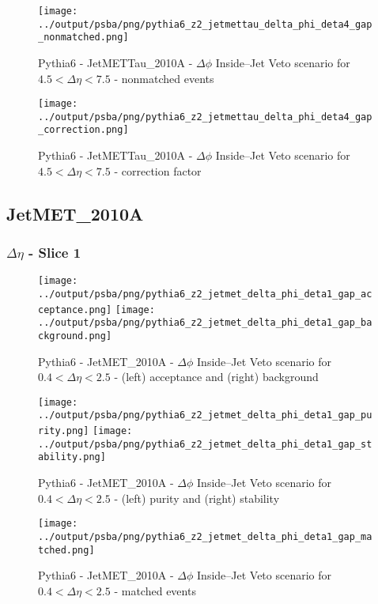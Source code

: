 \documentclass[11pt]{book}
\begin{document}
\begin{figure}[ht]
\centering
\texttt{[image: ../output/psba/png/pythia6\_z2\_jetmettau\_delta\_phi\_deta4\_gap\_nonmatched.png]}
\caption{Pythia6 - JetMETTau\_2010A - $\Delta\phi$ Inside--Jet Veto scenario for $4.5 < \Delta\eta < 7.5$ - nonmatched events}
\label{fig:p6_jetmettau_delta_phi_deta4_gap_nonmatched}
\end{figure}

\begin{figure}[ht]
\centering
\texttt{[image: ../output/psba/png/pythia6\_z2\_jetmettau\_delta\_phi\_deta4\_gap\_correction.png]}
\caption{Pythia6 - JetMETTau\_2010A - $\Delta\phi$ Inside--Jet Veto scenario for $4.5 < \Delta\eta < 7.5$ - correction factor}
\label{fig:p6_jetmettau_delta_phi_deta4_gap_correction}
\end{figure}

\clearpage
\subsection{JetMET\_2010A}
\subsubsection{$\Delta\eta$ - Slice 1}
\begin{figure}[ht]
\centering
\texttt{[image: ../output/psba/png/pythia6\_z2\_jetmet\_delta\_phi\_deta1\_gap\_acceptance.png]}
\texttt{[image: ../output/psba/png/pythia6\_z2\_jetmet\_delta\_phi\_deta1\_gap\_background.png]}
\caption{Pythia6 - JetMET\_2010A - $\Delta\phi$ Inside--Jet Veto scenario for $0.4 < \Delta\eta < 2.5$ - (left) acceptance and (right) background}
\label{fig:p6_jetmet_delta_phi_deta1_gap_ab}
\end{figure}

\begin{figure}[ht]
\centering
\texttt{[image: ../output/psba/png/pythia6\_z2\_jetmet\_delta\_phi\_deta1\_gap\_purity.png]}
\texttt{[image: ../output/psba/png/pythia6\_z2\_jetmet\_delta\_phi\_deta1\_gap\_stability.png]}
\caption{Pythia6 - JetMET\_2010A - $\Delta\phi$ Inside--Jet Veto scenario for $0.4 < \Delta\eta < 2.5$ - (left) purity and (right) stability}
\label{fig:p6_jetmet_delta_phi_deta1_gap_ps}
\end{figure}

\begin{figure}[ht]
\centering
\texttt{[image: ../output/psba/png/pythia6\_z2\_jetmet\_delta\_phi\_deta1\_gap\_matched.png]}
\caption{Pythia6 - JetMET\_2010A - $\Delta\phi$ Inside--Jet Veto scenario for $0.4 < \Delta\eta < 2.5$ - matched events}
\label{fig:p6_jetmet_delta_phi_deta1_gap_matched}
\end{figure}
\end{document}
